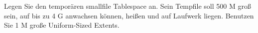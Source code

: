     \item Legen Sie den tempor\"aren smallfile Tablespace  an. Sein Tempfile  soll 500 M gro\ss{} sein, auf bis zu 4 G anwachsen k\"onnen,  hei\ss{}en und auf Laufwerk  liegen. Benutzen Sie 1 M gro\ss{}e Uniform-Sized Extents.
